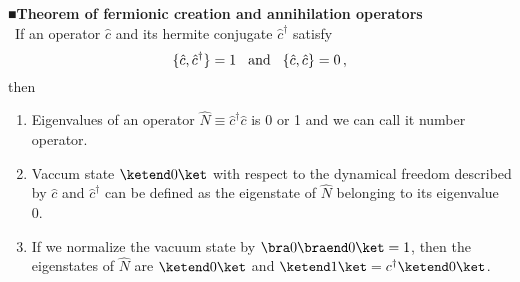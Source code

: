 \bigskip
\noindent
{\bf ■Theorem of fermionic creation and annihilation operators}\cite{ref:Takahashi_bussei1}\\\
If an operator $\hat{c}$ and its hermite conjugate $\hat{c}^\dagger$ satisfy
\begin{equation}
\{\hat{c}, \hat{c}^\dagger\} = 1
\hspace{3mm}
\mbox{and}
\hspace{3mm}
\{\hat{c}, \hat{c} \} = 0\,,
\end{equation}
then
\begin{enumerate}
\item Eigenvalues of an operator $\hat{N} \equiv \hat{c}^\dagger \hat{c}$ is
0 or 1 and we can call it number operator.
\item Vaccum state $\ketend 0 \ket$ with respect to the dynamical freedom described by $\hat{c}$
and $\hat{c}^\dagger$ can be defined as the eigenstate of
$\hat{N}$ belonging to its eigenvalue 0.
\item
If we normalize the vacuum state by $\bra 0 \braend 0 \ket = 1$, then the eigenstates
of $\hat{N}$ are $\ketend 0 \ket$ and $\ketend 1 \ket = c^\dagger \ketend 0 \ket$.
\end{enumerate}

